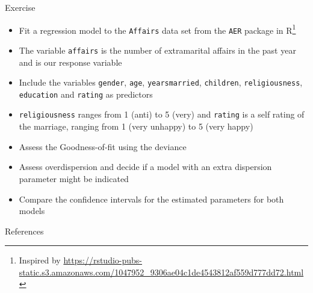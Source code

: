 \documentclass[aspectratio=169]{beamer}
\begin{document}
\begin{frame}[fragile]{}
  \begin{block}{Exercise}
    \begin{itemize}
      \item Fit a regression model to the \texttt{Affairs} data set from the
        \texttt{AER} package in R\footnote{Inspired by \url{https://rstudio-pubs-static.s3.amazonaws.com/1047952_9306ae04c1de4543812af559d777dd72.html}}
      \item The variable \texttt{affairs} is the number of extramarital affairs
        in the past year and is our response variable
      \item Include the variables \texttt{gender}, \texttt{age},
        \texttt{yearsmarried}, \texttt{children}, \texttt{religiousness},
        \texttt{education} and \texttt{rating} as predictors
      \item \texttt{religiousness} ranges from 1 (anti) to 5 (very) and
        \texttt{rating} is a self rating of the marriage, ranging from 1 (very
        unhappy) to 5 (very happy)
      \item Assess the Goodness-of-fit using the deviance
      \item Assess overdispersion and decide if a model with an extra dispersion
        parameter might be indicated
      \item Compare the confidence intervals for the estimated parameters for
    both models \end{itemize}
  \end{block}
\end{frame}

\appendix

\begin{frame}{References}
  \printbibliography
  \vfill
\end{frame}
\end{document}
